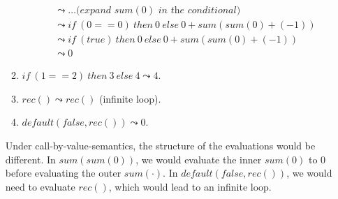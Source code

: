 \begin{exercise}{}
\begin{solution}
\begin{enumerate}
\begin{enumerate}
\begin{align*}
          &\leadsto \ldots \textit{(expand \(sum(0)\) in the conditional)} \\
          &\leadsto if ~(0 == 0) ~ then ~ 0 ~ else ~ 0 + sum(sum(0) + (-1))\\
          &\leadsto if ~(true) ~ then ~ 0 ~ else ~ 0 + sum(sum(0) + (-1))\\
          &\leadsto 0
        \end{align*}
        \item \(if ~(1 == 2) ~ then ~ 3 ~ else ~ 4 \leadsto 4\).
        \item \(rec() \leadsto rec()\) (infinite loop).
        \item \(default(false, rec()) \leadsto 0\).
      \end{enumerate}

      Under call-by-value-semantics, the structure of the evaluations would be
      different. In \(sum(sum(0))\), we would evaluate the inner \(sum(0)\) to
      \(0\) before evaluating the outer \(sum(\cdot)\). In \(default(false,
      rec())\), we would need to evaluate \(rec()\), which would lead to an
      infinite loop.
    \end{enumerate}
        
  \end{solution}
  
\end{exercise}
